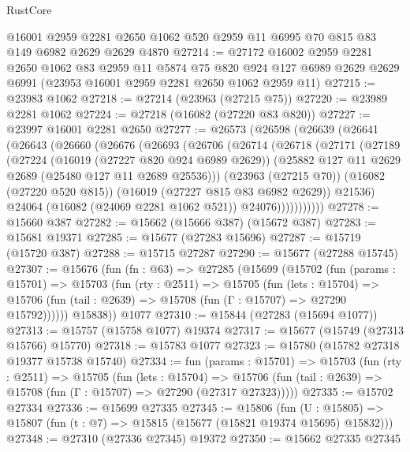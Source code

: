\begin{lexlean}{RustCore}
\begin{coremodule}
    @16001
    @2959
    @2281
    @2650
    @1062
    @520
    @2959
    @11
    @6995
    @70
    @815
    @83
    @149
    @6982
    @2629
    @2629
    @4870
@27214 := @27172
    @16002
    @2959
    @2281
    @2650
    @1062
    @83
    @2959
    @11
    @5874
    @75
    @820
    @924
    @127
    @6989
    @2629
    @2629
    @6991
    (@23953 @16001 @2959 @2281 @2650 @1062 @2959 @11)
@27215 := @23983 @1062
@27218 := @27214 (@23963 (@27215 @75))
@27220 := @23989 @2281 @1062
@27224 := @27218 (@16082 (@27220 @83 @820))
@27227 := @23997 @16001 @2281 @2650
@27277 := @26573
    (@26598
      (@26639
        (@26641
          (@26643
            (@26660
              (@26676
                (@26693
                  (@26706
                    (@26714
                      (@26718
                        (@27171
                          (@27189
                            (@27224
                              (@16019 (@27227 @820 @924 @6989 @2629))
                              (@25882 @127 @11 @2629 @2689 (@25480 @127 @11 @2689 @25536)))
                            (@23963 (@27215 @70))
                            (@16082 (@27220 @520 @815))
                            (@16019 (@27227 @815 @83 @6982 @2629))
                            @21536)
                          @24064
                          (@16082 (@24069 @2281 @1062 @521))
                          @24076)))))))))))
@27278 := @15660 @387
@27282 := @15662 (@15666 @387) (@15672 @387)
@27283 := @15681 @19371
@27285 := @15677 (@27283 @15696)
@27287 := @15719 (@15720 @387)
@27288 := @15715 @27287
@27290 := @15677 (@27288 @15745)
@27307 := @15676
    (fun (fn : @63) =>
    @27285
      (@15699
        (@15702
          (fun (params : @15701) =>
          @15703
            (fun (rty : @2511) =>
            @15705
              (fun (lets : @15704) =>
              @15706 (fun (tail : @2639) => @15708 (fun (Γ : @15707) => @27290 @15792))))))
        @15838))
    @1077
@27310 := @15844 (@27283 (@15694 @1077))
@27313 := @15757 (@15758 @1077) @19374
@27317 := @15677 (@15749 (@27313 @15766) @15770)
@27318 := @15783 @1077
@27323 := @15780 (@15782 @27318 @19377 @15738 @15740)
@27334 := fun (params : @15701) =>
  @15703
    (fun (rty : @2511) =>
    @15705
      (fun (lets : @15704) =>
      @15706 (fun (tail : @2639) => @15708 (fun (Γ : @15707) => @27290 (@27317 @27323)))))
@27335 := @15702 @27334
@27336 := @15699 @27335
@27345 := @15806
    (fun (U : @15805) => @15807 (fun (t : @7) => @15815 (@15677 (@15821 @19374 @15695) @15832)))
@27348 := @27310 (@27336 @27345) @19372
@27350 := @15662 @27335 @27345

\end{coremodule}
\end{lexlean}
